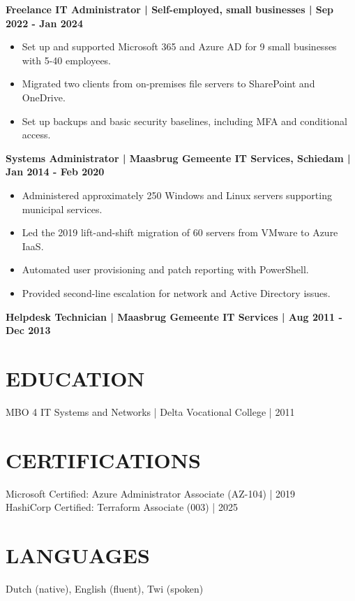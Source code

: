 \documentclass[11pt,a4paper]{article}
\begin{document}
\noindent\textbf{Freelance IT Administrator | Self-employed, small businesses | Sep 2022 - Jan 2024}
\begin{itemize}
\item Set up and supported Microsoft 365 and Azure AD for 9 small businesses with 5-40 employees.
\item Migrated two clients from on-premises file servers to SharePoint and OneDrive.
\item Set up backups and basic security baselines, including MFA and conditional access.
\end{itemize}

\noindent\textbf{Systems Administrator | Maasbrug Gemeente IT Services, Schiedam | Jan 2014 - Feb 2020}
\begin{itemize}
\item Administered approximately 250 Windows and Linux servers supporting municipal services.
\item Led the 2019 lift-and-shift migration of 60 servers from VMware to Azure IaaS.
\item Automated user provisioning and patch reporting with PowerShell.
\item Provided second-line escalation for network and Active Directory issues.
\end{itemize}

\noindent\textbf{Helpdesk Technician | Maasbrug Gemeente IT Services | Aug 2011 - Dec 2013}

\section*{EDUCATION}
MBO 4 IT Systems and Networks | Delta Vocational College | 2011

\section*{CERTIFICATIONS}
Microsoft Certified: Azure Administrator Associate (AZ-104) | 2019\\
HashiCorp Certified: Terraform Associate (003) | 2025

\section*{LANGUAGES}
Dutch (native), English (fluent), Twi (spoken)
\end{document}
